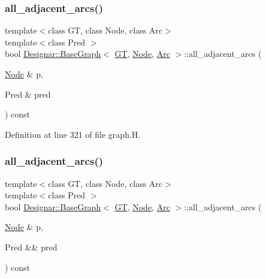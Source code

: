 \subsubsection{\texorpdfstring{all\+\_\+adjacent\+\_\+arcs()}{all\_adjacent\_arcs()}\hspace{0.1cm}{\footnotesize\ttfamily [1/2]}}
{\footnotesize\ttfamily template$<$class GT, class Node, class Arc$>$ \\
template$<$class Pred $>$ \\
bool \hyperlink{class_designar_1_1_base_graph}{Designar\+::\+Base\+Graph}$<$ \hyperlink{demo-buildgraph_8_c_a3001c40d2c31ca87ed96cd7d1334a55e}{GT}, \hyperlink{namespace_designar_a5af326c65aa2bd26b26c410f2030d09e}{Node}, \hyperlink{namespace_designar_a3f55fb5513d62ff47cbc8f72b8e95d6f}{Arc} $>$\+::all\+\_\+adjacent\+\_\+arcs (\begin{DoxyParamCaption}\item[{\hyperlink{namespace_designar_a5af326c65aa2bd26b26c410f2030d09e}{Node} \&}]{p,  }\item[{Pred \&}]{pred }\end{DoxyParamCaption}) const\hspace{0.3cm}{\ttfamily [inline]}}



Definition at line 321 of file graph.\+H.

\mbox{\label{class_designar_1_1_base_graph_aaae4400215b8ea6b55941875981c3892}} 
\subsubsection{\texorpdfstring{all\+\_\+adjacent\+\_\+arcs()}{all\_adjacent\_arcs()}\hspace{0.1cm}{\footnotesize\ttfamily [2/2]}}
{\footnotesize\ttfamily template$<$class GT, class Node, class Arc$>$ \\
template$<$class Pred $>$ \\
bool \hyperlink{class_designar_1_1_base_graph}{Designar\+::\+Base\+Graph}$<$ \hyperlink{demo-buildgraph_8_c_a3001c40d2c31ca87ed96cd7d1334a55e}{GT}, \hyperlink{namespace_designar_a5af326c65aa2bd26b26c410f2030d09e}{Node}, \hyperlink{namespace_designar_a3f55fb5513d62ff47cbc8f72b8e95d6f}{Arc} $>$\+::all\+\_\+adjacent\+\_\+arcs (\begin{DoxyParamCaption}\item[{\hyperlink{namespace_designar_a5af326c65aa2bd26b26c410f2030d09e}{Node} \&}]{p,  }\item[{Pred \&\&}]{pred }\end{DoxyParamCaption}) const\hspace{0.3cm}{\ttfamily [inline]}}



